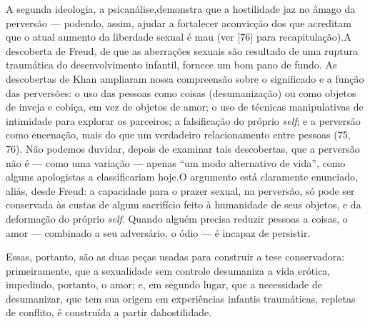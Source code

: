 A segunda ideologia, a psicanálise,\idxpsica[|(] demonstra que a hostilidade jaz
no âmago da perversão --- podendo, assim, ajudar a fortalecer a\idxsexuehos[|)]
convicção dos que acreditam que o atual aumento da liberdade sexual é
mau (ver [76] para recapitulação).\idxhost[|)] A descoberta de Freud,\idxfreudsexua{} de que as
aberrações sexuais são resultado de uma ruptura traumática do
desenvolvimento infantil, fornece um bom pano de fundo. As descobertas
de Khan\idxkhan{} ampliaram nossa compreensão sobre o significado e a função das
perversões: o uso das pessoas como coisas (desumanização) ou como
objetos de inveja e cobiça, em vez de objetos de amor; o uso de
técnicas manipulativas\idxpervtecni{} de intimidade\idxintim{} para explorar os parceiros; a
falsificação do próprio \textit{self}; e a perversão como encenação,
mais do que um verdadeiro relacionamento entre pessoas (75, 76). Não
podemos duvidar, depois de examinar tais descobertas, que a perversão
não é --- como uma variação --- apenas ``um modo
alternativo de vida'', como alguns apologistas a
classificariam hoje.\idxpervdirei[|(] O argumento está claramente enunciado, aliás,
desde Freud: a capacidade para o prazer sexual, na perversão, só pode
ser conservada às custas de algum sacrifício feito à humanidade de seus
objetos, e da deformação do próprio \textit{self}. Quando alguém
precisa reduzir pessoas a coisas, o amor --- combinado a seu
adversário, o ódio --- é incapaz de persistir.\idxpsica[|)]

Essas, portanto, são as duas peças usadas para construir a tese
conservadora: primeiramente, que a sexualidade\idxsexuateo{} sem controle desumaniza
a vida erótica, impedindo, portanto, o amor; e, em segundo lugar, que a
necessidade de desumanizar, que tem sua origem em experiências infantis
traumáticas, repletas de conflito, é construída a partir\idxhostdesu{} da\idxdesu[|)]
hostilidade.

